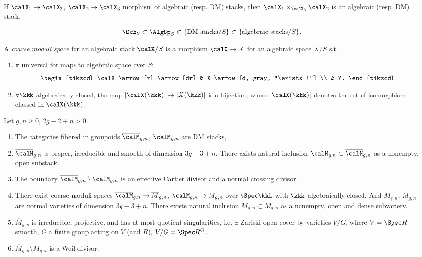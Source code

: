   If $\calX_1 \to \calX_3$, $\calX_2 \to \calX_3$ morphism of algebraic (resp. DM) stacks, then $\calX_1 \times_{\calX_3} \calX_2$ is an algebraic (resp. DM) stack.
  
  \begin{slogan}
    \[ \Sch_S \subset \AlgSp_S \subset \{\text{DM stacks}/S\} \subset \{\text{algebraic stacks}/S\}. \]
  \end{slogan}    

  \begin{definition}
    A \emph{coarse moduli space} for an algebraic stack $\calX/S$ is a morphism $\calX \to X$ for an algebraic space $X/S$ s.t.
    \begin{enumerate}
      \item $\pi$ universal for maps to algebraic space over $S$:
        \[ \begin{tikzcd}
          \calX \arrow[r] \arrow[dr] & X \arrow[d, gray, "\exists !"] \\
          & Y.
        \end{tikzcd} \]
      \item $\forall \kkk$ algebraically closed, the map $|\calX(\kkk)| \to |X(\kkk)|$ is a bijection, where $|\calX(\kkk)|$ denotes the set of isomorphism classed in $\calX(\kkk)$.
    \end{enumerate}
  \end{definition}

  \begin{theorem}
    Let $g,n \geq 0$, $2g - 2 + n > 0$.
    \begin{enumerate}[label=(\arabic*)]
      \item The categories fibered in groupoids $\overline{\calM}_{g,n}$, $\calM_{g,n}$ are DM stacks,
      \item $\overline{\calM}_{g,n}$ is proper, irreducible and smooth of dimension $3g-3+n$.
        There exists natural inclusion $\calM_{g,n} \subset \overline{\calM}_{g,n}$ as a nonempty, open substack.
      \item The boundary $\overline{\calM}_{g,n} \setminus \calM_{g,n}$ is an effective Cartier divisor and a normal crossing divisor.
      \item There exist coarse moduli spaces $\overline{\calM}_{g,n} \to \overline{M}_{g,n}$, $\calM_{g,n} \to M_{g,n}$ over $\Spec \kkk$ with $\kkk$ algebraically closed.
        And $\overline{M}_{g,n}$, $M_{g,n}$ are normal varieties of dimension $3g-3+n$.
        There exists natural inclusion $M_{g,n} \subset \overline{M}_{g,n}$ as a nonempty, open and dense subvariety.
      \item $\overline{M}_{g,n}$ is irreducible, projective, and has at most quotient singularities, i.e. $\exists$ Zariski open cover by varieties $V/G$, where $V = \Spec R$ smooth, $G$ a finite group acting on $V$ (and $R$), $V/G = \Spec R^G$.
      \item $\overline{M}_{g,n} \setminus M_{g,n}$ is a Weil divisor.
    \end{enumerate}
  \end{theorem}


